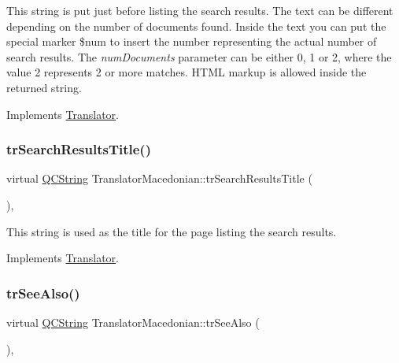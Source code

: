 This string is put just before listing the search results. The text can be different depending on the number of documents found. Inside the text you can put the special marker \$num to insert the number representing the actual number of search results. The {\itshape num\+Documents} parameter can be either 0, 1 or 2, where the value 2 represents 2 or more matches. H\+T\+ML markup is allowed inside the returned string. 

Implements \mbox{\hyperlink{class_translator}{Translator}}.

\mbox{\label{class_translator_macedonian_a3aa59f4f638f5be8aa69df2b7a5d934c}} 
\subsubsection{\texorpdfstring{trSearchResultsTitle()}{trSearchResultsTitle()}}
{\footnotesize\ttfamily virtual \mbox{\hyperlink{class_q_c_string}{Q\+C\+String}} Translator\+Macedonian\+::tr\+Search\+Results\+Title (\begin{DoxyParamCaption}{ }\end{DoxyParamCaption})\hspace{0.3cm}{\ttfamily [inline]}, {\ttfamily [virtual]}}

This string is used as the title for the page listing the search results. 

Implements \mbox{\hyperlink{class_translator}{Translator}}.

\mbox{\label{class_translator_macedonian_a7fb65c613d403bdfabab7497decb7c20}} 
\subsubsection{\texorpdfstring{trSeeAlso()}{trSeeAlso()}}
{\footnotesize\ttfamily virtual \mbox{\hyperlink{class_q_c_string}{Q\+C\+String}} Translator\+Macedonian\+::tr\+See\+Also (\begin{DoxyParamCaption}{ }\end{DoxyParamCaption})\hspace{0.3cm}{\ttfamily [inline]}, {\ttfamily [virtual]}}

